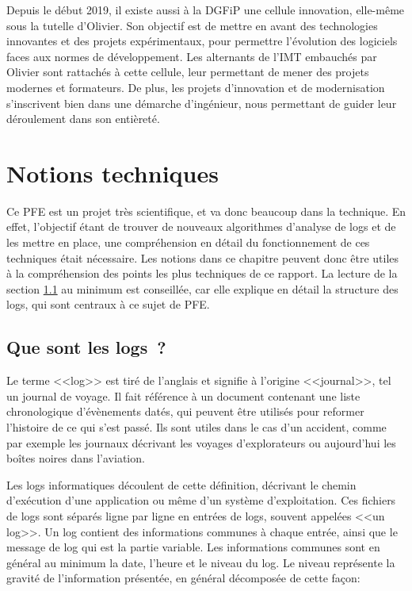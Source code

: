 \documentclass[openany, 11pt]{memoir}
\begin{document}
\bigskip
Depuis le début 2019, il existe aussi à la DGFiP une cellule innovation, elle-même sous la tutelle d'Olivier. Son objectif est de mettre en avant des technologies innovantes et des projets expérimentaux, pour permettre l'évolution des logiciels faces aux normes de développement. Les alternants de l'IMT embauchés par Olivier sont rattachés à cette cellule, leur permettant de mener des projets modernes et formateurs. De plus, les projets d'innovation et de modernisation s'inscrivent bien dans une démarche d'ingénieur, nous permettant de guider leur déroulement dans son entièreté.

\newpage
\chapter{Notions techniques}

Ce PFE est un projet très scientifique, et va donc beaucoup dans la technique. En effet, l'objectif étant de trouver de nouveaux algorithmes d'analyse de \glspl{log} et de les mettre en place, une compréhension en détail du fonctionnement de ces techniques était nécessaire. Les notions dans ce chapitre peuvent donc être utiles à la compréhension des points les plus techniques de ce rapport. La lecture de la section \ref{logs} au minimum est conseillée, car elle explique en détail la structure des logs, qui sont centraux à ce sujet de PFE.

\section{Que sont les logs~?}
\label{logs}

Le terme <<log>> est tiré de l'anglais et signifie à l'origine <<journal>>, tel un journal de voyage. Il fait référence à un document contenant une liste chronologique d'évènements datés, qui peuvent être utilisés pour reformer l'histoire de ce qui s'est passé. Ils sont utiles dans le cas d'un accident, comme par exemple les journaux décrivant les voyages d'explorateurs ou aujourd'hui les boîtes noires dans l'aviation.

Les logs informatiques découlent de cette définition, décrivant le chemin d'exécution d'une application ou même d'un système d'exploitation. Ces fichiers de logs sont séparés ligne par ligne en entrées de logs, souvent appelées <<un log>>. Un log contient des informations communes à chaque entrée, ainsi que le message de log qui est la partie variable. Les informations communes sont en général au minimum la date, l'heure et le niveau du log. Le niveau représente la gravité de l'information présentée, en général décomposée de cette façon:
\end{document}
